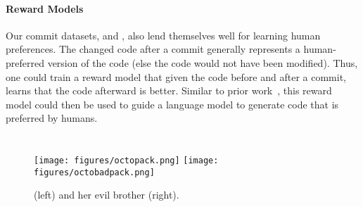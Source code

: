 \paragraph{Reward Models} Our commit datasets, \data{} and \dataft{}, also lend themselves well for learning human preferences. The changed code after a commit generally represents a human-preferred version of the code (else the code would not have been modified). Thus, one could train a reward model that given the code before and after a commit, learns that the code afterward is better. Similar to prior work~\citep{ouyang2022training}, this reward model could then be used to guide a language model to generate code that is preferred by humans.



\section{\badpack{}}
\label{sec:octobadpack}

\begin{figure*}[htbp]
    \centering
    {{\texttt{[image: figures/octopack.png]}}}
    \qquad
    {{\texttt{[image: figures/octobadpack.png]}}}
    \caption{\pack{} (left) and her evil brother \badpack{} (right).}
    \label{fig:cdp}
\end{figure*}

